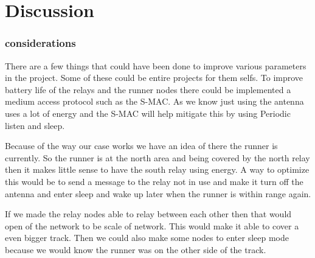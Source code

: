 \chapter{Discussion}
\subsection{considerations}
There are a few things that could have been done to improve various parameters in the project. Some of these could be entire projects for them selfs.
To improve battery life of the relays and the runner nodes there could be implemented a medium access protocol such as the S-MAC. As we know just using the antenna uses a lot of energy and the S-MAC will help mitigate this by using Periodic listen and sleep.

Because of the way our case works we have an idea of there the runner is currently. So the runner is at the north area and being covered by the north relay then it makes little sense to have the south relay using energy. A way to optimize this would be to send a message to the relay not in use and make it turn off the antenna and enter sleep and wake up later when the runner is within range again.   

If we made the relay nodes able to relay between each other then that would open of the network to be scale of network. This would make it able to cover a even bigger track. Then we could also make some nodes to enter sleep mode because we would know the runner was on the other side of the track.